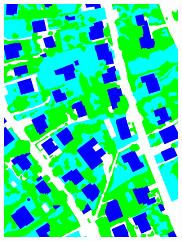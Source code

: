 \begin{figure}[htb]
\begin{subfigure}{0.24\textwidth}
   \includegraphics[width=1\linewidth]{fig/vai/23_gt.png}
   \caption{}
 \end{subfigure}
 \begin{subfigure}{0.24\textwidth}
   \centering

\end{subfigure}
\end{figure}

